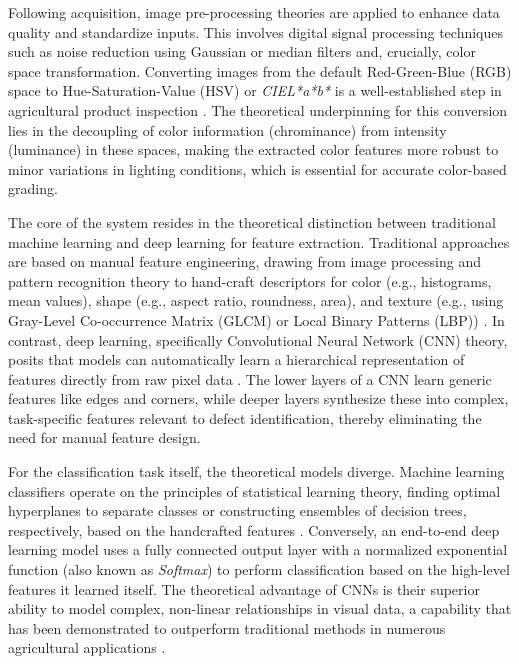 {Following acquisition, image pre-processing theories are applied to enhance data quality and standardize inputs. This involves digital signal processing techniques such as noise reduction using Gaussian or median filters \citep{kumar2020comparative} and, crucially, color space transformation. Converting images from the default Red-Green-Blue (RGB) space to Hue-Saturation-Value (HSV) or \textit{CIEL*a*b*} is a well-established step in agricultural product inspection \citep{khan2024intelligent}. The theoretical underpinning for this conversion lies in the decoupling of color information (chrominance) from intensity (luminance) in these spaces, making the extracted color features more robust to minor variations in lighting conditions, which is essential for accurate color-based grading.

The core of the system resides in the theoretical distinction between traditional machine learning and deep learning for feature extraction. Traditional approaches are based on manual feature engineering, drawing from image processing and pattern recognition theory to hand-craft descriptors for color (e.g., histograms, mean values), shape (e.g., aspect ratio, roundness, area), and texture (e.g., using Gray-Level Co-occurrence Matrix (GLCM) or Local Binary Patterns (LBP)) \citep{haralick2007textural,ojala2002multiresolution}. In contrast, deep learning, specifically Convolutional Neural Network (CNN) theory, posits that models can automatically learn a hierarchical representation of features directly from raw pixel data \citep{lecun2015deep,goodfellow2016deep}. The lower layers of a CNN learn generic features like edges and corners, while deeper layers synthesize these into complex, task-specific features relevant to defect identification, thereby eliminating the need for manual feature design.

For the classification task itself, the theoretical models diverge. Machine learning classifiers operate on the principles of statistical learning theory, finding optimal hyperplanes to separate classes or constructing ensembles of decision trees, respectively, based on the handcrafted features \citep{hearst1998support,breiman2001random}. Conversely, an end-to-end deep learning model uses a fully connected output layer with a normalized exponential function (also known as \textit{Softmax}) to perform classification based on the high-level features it learned itself. The theoretical advantage of CNNs is their superior ability to model complex, non-linear relationships in visual data, a capability that has been demonstrated to outperform traditional methods in numerous agricultural applications \citep{bharman2022deep}.

}
